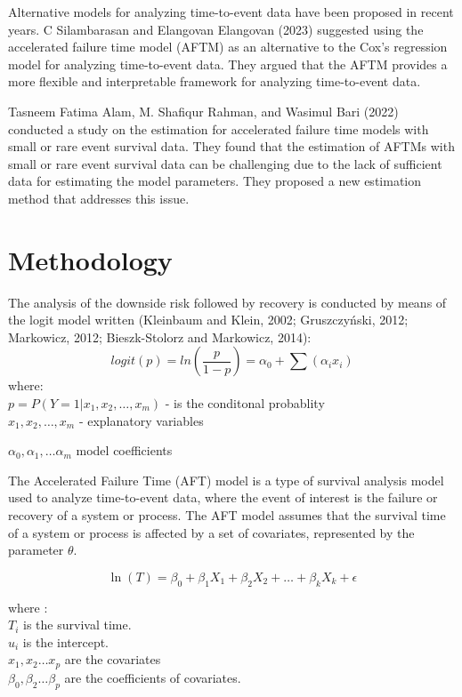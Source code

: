 \documentclass[twoside,a4paper,12pt]{article}
\begin{document}
\noindent Alternative models for analyzing time-to-event data have been proposed in recent years. C Silambarasan and Elangovan Elangovan (2023) suggested using the accelerated failure time model (AFTM) as an alternative to the Cox's regression model for analyzing time-to-event data. They argued that the AFTM provides a more flexible and interpretable framework for analyzing time-to-event data.

\noindent Tasneem Fatima Alam, M. Shafiqur Rahman, and Wasimul Bari (2022) conducted a study on the estimation for accelerated failure time models with small or rare event survival data. They found that the estimation of AFTMs with small or rare event survival data can be challenging due to the lack of sufficient data for estimating the model parameters. They proposed a new estimation method that addresses this issue.


\section*{Methodology} 
The analysis of the downside risk followed by recovery is conducted by means of the logit
model written (Kleinbaum and Klein, 2002; Gruszczyński, 2012; Markowicz, 2012; Bieszk-Stolorz and Markowicz, 2014):
\begin{equation}
logit(p)=ln(\frac{p}{1-p})=\alpha_0 +\sum(\alpha_i x_i)
 \label{eq:logit_model}
\end{equation}
where:\\
$p=P(Y=1|x_1,x_2,\ldots,x_m)$ - is the conditonal probablity\\

$x_1,x_2,\ldots,x_m$ - explanatory variables

$\alpha_0,\alpha_1,\ldots\alpha_m$ model coefficients

\vspace{1.5cm}


\noindent The Accelerated Failure Time (AFT) model is a type of survival analysis model used to analyze time-to-event data, where the event of interest is the failure or recovery of a system or process. The AFT model assumes that the survival time of a system or process is affected by a set of covariates, represented by the parameter $\theta$.  


\begin{equation}	
		\ln(T) = \beta_0 + \beta_1 X_1 + \beta_2 X_2 + \dots + \beta_k X_k + \epsilon \label{eq:1} 	
\end{equation}

where :\\
$T_i$ 	is the survival time.\\
$u_i$ 	is the intercept.\\
$x_1,x_2 \dots x_p$	 are the covariates\\
$\beta_0,\beta_2 \dots \beta_p$ 	are the coefficients of covariates.\\
\end{document}
